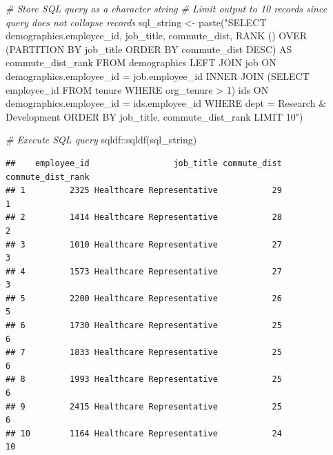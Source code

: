\documentclass[
]{book}
\newenvironment{Shaded}{\begin{snugshade}}{\end{snugshade}}
\newcommand{\CommentTok}[1]{\textcolor[rgb]{0.56,0.35,0.01}{\textit{#1}}}
\newcommand{\FunctionTok}[1]{\textcolor[rgb]{0.00,0.00,0.00}{#1}}
\newcommand{\NormalTok}[1]{#1}
\newcommand{\OtherTok}[1]{\textcolor[rgb]{0.56,0.35,0.01}{#1}}
\newcommand{\SpecialCharTok}[1]{\textcolor[rgb]{0.00,0.00,0.00}{#1}}
\newcommand{\StringTok}[1]{\textcolor[rgb]{0.31,0.60,0.02}{#1}}
\begin{document}
\begin{Shaded}
\begin{Highlighting}[]
\CommentTok{\# Store SQL query as a character string}
\CommentTok{\# Limit output to 10 records since query does not collapse records}
\NormalTok{sql\_string }\OtherTok{\textless{}{-}} \FunctionTok{paste}\NormalTok{(}\StringTok{"SELECT}
\StringTok{                      demographics.employee\_id,}
\StringTok{                      job\_title,}
\StringTok{                      commute\_dist,}
\StringTok{                      RANK () OVER (PARTITION BY job\_title ORDER BY commute\_dist DESC) AS commute\_dist\_rank}
\StringTok{                    FROM}
\StringTok{                        demographics}
\StringTok{                      LEFT JOIN}
\StringTok{                        job}
\StringTok{                      ON}
\StringTok{                        demographics.employee\_id = job.employee\_id}
\StringTok{                      INNER JOIN}
\StringTok{                        (SELECT employee\_id FROM tenure WHERE org\_tenure \textgreater{} 1) ids}
\StringTok{                      ON}
\StringTok{                        demographics.employee\_id = ids.employee\_id}
\StringTok{                    WHERE}
\StringTok{                      dept = \textquotesingle{}Research \& Development\textquotesingle{}}
\StringTok{                    ORDER BY}
\StringTok{                      job\_title,}
\StringTok{                      commute\_dist\_rank}
\StringTok{                    LIMIT 10"}\NormalTok{)}

\CommentTok{\# Execute SQL query}
\NormalTok{sqldf}\SpecialCharTok{::}\FunctionTok{sqldf}\NormalTok{(sql\_string)}
\end{Highlighting}
\end{Shaded}

\begin{verbatim}
##    employee_id                 job_title commute_dist commute_dist_rank
## 1         2325 Healthcare Representative           29                 1
## 2         1414 Healthcare Representative           28                 2
## 3         1010 Healthcare Representative           27                 3
## 4         1573 Healthcare Representative           27                 3
## 5         2200 Healthcare Representative           26                 5
## 6         1730 Healthcare Representative           25                 6
## 7         1833 Healthcare Representative           25                 6
## 8         1993 Healthcare Representative           25                 6
## 9         2415 Healthcare Representative           25                 6
## 10        1164 Healthcare Representative           24                10
\end{verbatim}
\end{document}
